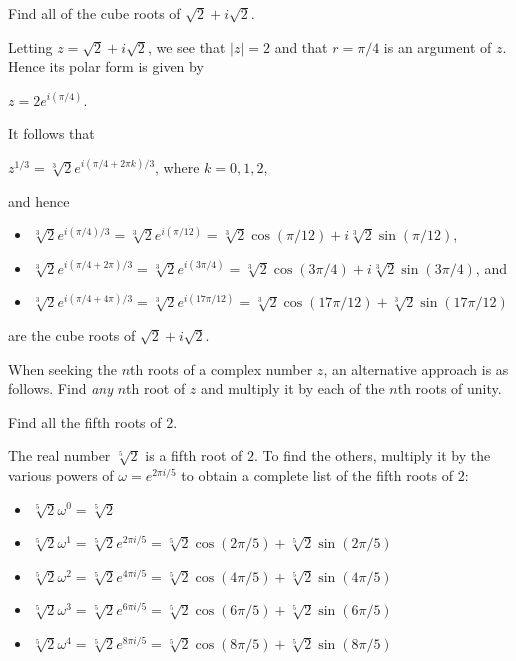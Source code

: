 \documentclass[11pt,fleqn,dvipsnames,usenames]{article}
\newcommand{\p}{\noindent}
\begin{document}
%
\begin{example}
Find all of the cube roots of $\sqrt{2} + i\sqrt{2}$.
\end{example}
%
\begin{solution}
Letting $z = \sqrt{2} + i\sqrt{2}$, we see that $|z| = 2$ and that $r = \pi/4$ is an argument of $z$.  Hence its polar form is given by
\begin{center}
$z = 2e^{i(\pi/4)}$.
\end{center}
\p It follows that
\begin{center}
$z^{1/3} = \sqrt[3]{2}e^{i(\pi/4 + 2\pi k)/3}$, where $k = 0,1,2$,
\end{center}
\p and hence
\begin{itemize}[\ ]
\item $\sqrt[3]{2}e^{i(\pi/4)/3} = \sqrt[3]{2}e^{i(\pi/12)} = \sqrt[3]{2}\cos(\pi/12) + i\sqrt[3]{2}\sin(\pi/12)$,
\item $\sqrt[3]{2}e^{i(\pi/4 + 2\pi)/3} = \sqrt[3]{2}e^{i(3\pi/4)} = \sqrt[3]{2}\cos(3\pi/4) + i\sqrt[3]{2}\sin(3\pi/4)$, and
\item $\sqrt[3]{2}e^{i(\pi/4 + 4\pi)/3} = \sqrt[3]{2}e^{i(17\pi/12)} = \sqrt[3]{2}\cos(17\pi/12) + \sqrt[3]{2}\sin(17\pi/12)$
\end{itemize}
are the cube roots of $\sqrt{2} + i\sqrt{2}$.
\end{solution}
%
\begin{remark}
When seeking the $n$th roots of a complex number $z$, an alternative approach is as follows.  Find \emph{any} $n$th root of $z$ and multiply it by each of the $n$th roots of unity.
\end{remark}
%
\begin{example}
Find all the fifth roots of $2$.
\end{example}
%
\begin{solution}
The real number $\sqrt[5]{2}$ is a fifth root of $2$.  To find the others, multiply it by the various powers of $\omega = e^{2\pi i/5}$ to obtain a complete list of the fifth roots of $2$:
\begin{itemize}[\ ]
\item $\sqrt[5]{2}\omega^{0} = \sqrt[5]{2}$
\item $\sqrt[5]{2}\omega^{1} = \sqrt[5]{2}e^{2\pi i/5} = \sqrt[5]{2}\cos(2\pi/5) + \sqrt[5]{2}\sin(2\pi/5)$
\item $\sqrt[5]{2}\omega^{2} = \sqrt[5]{2}e^{4\pi i/5} = \sqrt[5]{2}\cos(4\pi/5) + \sqrt[5]{2}\sin(4\pi/5)$
\item $\sqrt[5]{2}\omega^{3} = \sqrt[5]{2}e^{6\pi i/5} = \sqrt[5]{2}\cos(6\pi/5) + \sqrt[5]{2}\sin(6\pi/5)$
\item $\sqrt[5]{2}\omega^{4} = \sqrt[5]{2}e^{8\pi i/5} = \sqrt[5]{2}\cos(8\pi/5) + \sqrt[5]{2}\sin(8\pi/5)$
\end{itemize}
\end{solution}
%
\end{document}
